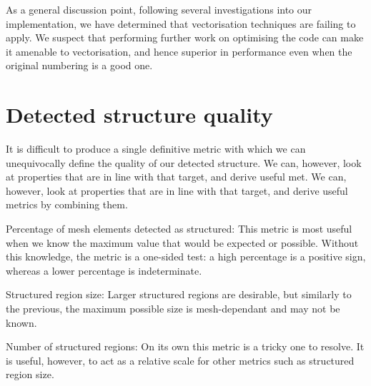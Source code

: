 As a general discussion point, following several investigations into our implementation, we have determined that vectorisation techniques are failing to apply. We suspect that performing further work on optimising the code can make it amenable to vectorisation, and hence superior in performance even when the original numbering is a good one.



\section{Detected structure quality}
It is difficult to produce a single definitive metric with which we can unequivocally define the quality of our detected structure. We can, however, look at properties that are in line with that target, and derive useful met. We can, however, look at properties that are in line with that target, and derive useful metrics by combining them.

Percentage of mesh elements detected as structured:
This metric is most useful when we know the maximum value that would be expected or possible.
Without this knowledge, the metric is a one-sided test: a high percentage is a positive sign, whereas a lower percentage is indeterminate.

Structured region size:
Larger structured regions are desirable, but similarly to the previous, the maximum possible size is mesh-dependant and may not be known.

Number of structured regions:
On its own this metric is a tricky one to resolve. It is useful, however, to act as a relative scale for other metrics such as structured region size.





